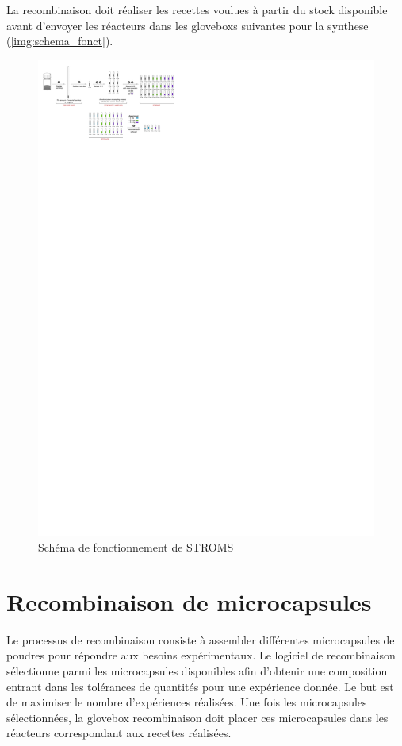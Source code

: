 La recombinaison doit réaliser les \glspl{recette} voulues à partir du stock disponible avant d'envoyer les réacteurs dans les \glspl{glovebox} suivantes pour la \gls{synthese} (\cf \autoref{img:schema_fonct}).
\begin{figure}[H]
    \includegraphics[width=\linewidth]{assets/figures/schema_fonct.svg}
    \caption{Schéma de fonctionnement de STROMS}
    \label{img:schema_fonct}
\end{figure}

\section{Recombinaison de microcapsules}
Le processus de recombinaison consiste à assembler différentes \glspl{microcapsule} de poudres pour répondre aux besoins expérimentaux. Le logiciel de recombinaison sélectionne parmi les \glspl{microcapsule} disponibles afin d'obtenir une composition entrant dans les tolérances de quantités pour une expérience donnée. Le but est de maximiser le nombre d'expériences réalisées. Une fois les \glspl{microcapsule} sélectionnées, la \gls{glovebox} recombinaison doit placer ces \glspl{microcapsule} dans les réacteurs correspondant aux \glspl{recette} réalisées.